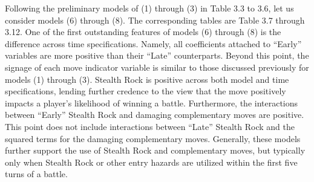 \documentclass[12pt,twoside]{reedthesis}
\begin{document}
  Following the preliminary models of (1) through (3) in Table 3.3 to 3.6,
  let us consider models (6) through (8). The corresponding tables are
  Table 3.7 through 3.12. One of the first outstanding features of models
  (6) through (8) is the difference across time specifications. Namely,
  all coefficients attached to ``Early'' variables are more positive than
  their ``Late'' counterparts. Beyond this point, the signage of each move
  indicator variable is similar to those discussed previously for models
  (1) through (3). Stealth Rock is positive across both model and time
  specifications, lending further credence to the view that the move
  positively impacts a player's likelihood of winning a battle.
  Furthermore, the interactions between ``Early'' Stealth Rock and
  damaging complementary moves are positive. This point does not include
  interactions between ``Late'' Stealth Rock and the squared terms for the
  damaging complementary moves. Generally, these models further support
  the use of Stealth Rock and complementary moves, but typically only when
  Stealth Rock or other entry hazards are utilized within the first five
  turns of a battle.
  
\end{document}
